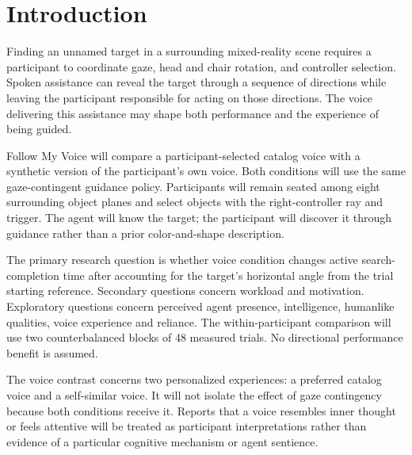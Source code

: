 \documentclass[11pt,letterpaper]{article}
\begin{document}
\setcounter{section}{0}
\section{Introduction}
Finding an unnamed target in a surrounding mixed-reality scene requires a participant to coordinate gaze, head and chair rotation, and controller selection. Spoken assistance can reveal the target through a sequence of directions while leaving the participant responsible for acting on those directions. The voice delivering this assistance may shape both performance and the experience of being guided.

Follow My Voice will compare a participant-selected catalog voice with a synthetic version of the participant's own voice. Both conditions will use the same gaze-contingent guidance policy. Participants will remain seated among eight surrounding object planes and select objects with the right-controller ray and trigger. The agent will know the target; the participant will discover it through guidance rather than a prior color-and-shape description.

The primary research question is whether voice condition changes active search-completion time after accounting for the target's horizontal angle from the trial starting reference. Secondary questions concern workload and motivation. Exploratory questions concern perceived agent presence, intelligence, humanlike qualities, voice experience and reliance. The within-participant comparison will use two counterbalanced blocks of 48 measured trials. No directional performance benefit is assumed.

The voice contrast concerns two personalized experiences: a preferred catalog voice and a self-similar voice. It will not isolate the effect of gaze contingency because both conditions receive it. Reports that a voice resembles inner thought or feels attentive will be treated as participant interpretations rather than evidence of a particular cognitive mechanism or agent sentience.
\end{document}
